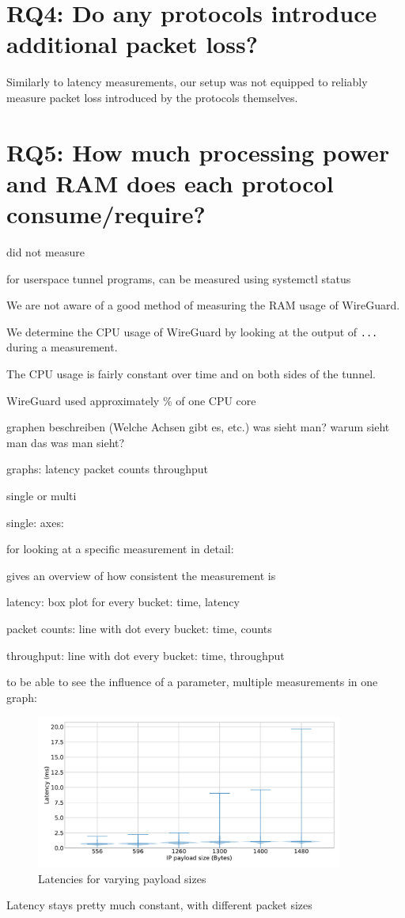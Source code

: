 \section{RQ4: Do any protocols introduce additional packet loss?}
Similarly to latency measurements, our setup was not equipped to reliably measure packet loss introduced by the protocols themselves.



\section{RQ5: How much processing power and RAM does each protocol consume/require?}
did not measure

for userspace tunnel programs, can be measured using systemctl status

We are not aware of a good method of measuring the RAM usage of WireGuard.

We determine the CPU usage of WireGuard by looking at the output of \texttt{...} during a measurement.

The CPU usage is fairly constant over time and on both sides of the tunnel.

WireGuard used approximately \% of one CPU core



graphen beschreiben (Welche Achsen gibt es, etc.)
was sieht man?
warum sieht man das was man sieht?


graphs:
latency
packet counts
throughput

single or multi

single: axes:

for looking at a specific measurement in detail:

gives an overview of how consistent the measurement is

latency: box plot for every bucket: time, latency

packet counts: line with dot every bucket: time, counts

throughput: line with dot every bucket: time, throughput


to be able to see the influence of a parameter, multiple measurements in one graph:

\begin{figure}[tbh]
	\centering
	\includegraphics[draft=false,width=0.9\textwidth]{figures/Graphs/graph-1-mtu/latencies.pdf}
	\caption{Latencies for varying payload sizes}\label{fix:graph-1-mtu-latencies}
\end{figure}
Latency stays pretty much constant, with different packet sizes


